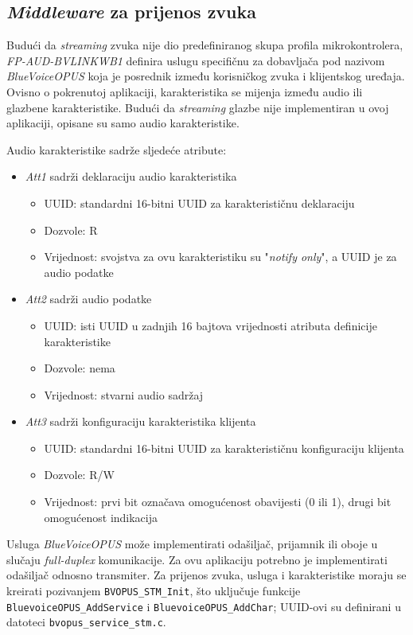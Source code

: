 \subsection{\textit{Middleware} za prijenos zvuka}

Budući da \textit{streaming} zvuka nije dio predefiniranog skupa profila mikrokontrolera, \textit{FP-AUD-BVLINKWB1} definira uslugu specifičnu za dobavljača pod nazivom \textit{BlueVoiceOPUS} koja je posrednik između korisničkog zvuka i  klijentskog uređaja. Ovisno o pokrenutoj aplikaciji, karakteristika se mijenja između audio ili glazbene karakteristike. Budući da \textit{streaming} glazbe nije implementiran u ovoj aplikaciji, opisane su samo audio karakteristike. 

Audio karakteristike sadrže sljedeće atribute:
\begin{itemize}
	\item \textit{Att1} sadrži deklaraciju audio karakteristika
	\begin{itemize}
		\item UUID: standardni 16-bitni UUID za karakterističnu deklaraciju
		\item Dozvole: R
		\item Vrijednost: svojstva za ovu karakteristiku su "\textit{notify only}", a UUID je za audio podatke
	\end{itemize}
	\item \textit{Att2} sadrži audio podatke
	\begin{itemize}
		\item UUID: isti UUID u zadnjih 16 bajtova vrijednosti atributa definicije karakteristike
		\item Dozvole: nema
		\item Vrijednost: stvarni audio sadržaj
	\end{itemize}
	\item \textit{Att3} sadrži konfiguraciju karakteristika klijenta
	\begin{itemize}
		\item UUID: standardni 16-bitni UUID za karakterističnu konfiguraciju klijenta
		\item Dozvole: R/W
		\item Vrijednost: prvi bit označava omogućenost obavijesti (0 ili 1), drugi bit omogućenost indikacija
	\end{itemize}
\end{itemize}

Usluga \textit{BlueVoiceOPUS} može implementirati odašiljač, prijamnik ili oboje u slučaju \textit{full-duplex} komunikacije. Za ovu aplikaciju potrebno je implementirati odašiljač odnosno transmiter.
Za prijenos zvuka, usluga i karakteristike moraju se kreirati pozivanjem \lstinline|BVOPUS_STM_Init|, što uključuje funkcije \lstinline|BluevoiceOPUS_AddService| i \lstinline|BluevoiceOPUS_AddChar|; UUID-ovi su definirani u datoteci \lstinline|bvopus_service_stm.c|.

